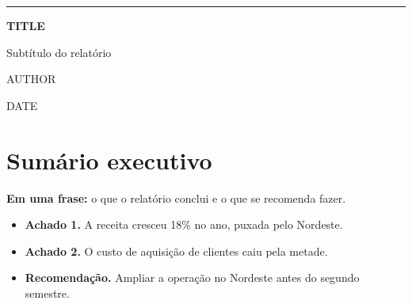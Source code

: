 \documentclass[11pt,a4paper]{report}
\begin{document}
\begin{titlepage}
  \pagecolor{tocaInk}\color{white}
  \vspace*{6cm}
  \hspace*{2.5cm}\begin{minipage}{0.75\paperwidth}
    {\color{tocaHoney}\rule{3cm}{5pt}}\par\vspace{1cm}
    {\fontsize{34}{40}\selectfont\bfseries {{TITLE}}\par}\vspace{0.6cm}
    {\Large Subtítulo do relatório\par}\vspace{3cm}
    {\large {{AUTHOR}}\par}\vspace{0.2cm}
    {\par}\vspace{0.2cm}
    {{DATE}}
  \end{minipage}
  \vfill
  \par\vspace{2cm}
  \restoregeometry
\end{titlepage}
\nopagecolor\color{black}

\chapter*{Sumário executivo}

\begin{destaque}
  \textbf{Em uma frase:} o que o relatório conclui e o que se recomenda fazer.
\end{destaque}

\begin{itemize}
  \item \textbf{Achado 1.} A receita cresceu 18\% no ano, puxada pelo Nordeste.
  \item \textbf{Achado 2.} O custo de aquisição de clientes caiu pela metade.
  \item \textbf{Recomendação.} Ampliar a operação no Nordeste antes do segundo semestre.
\end{itemize}
\end{document}
